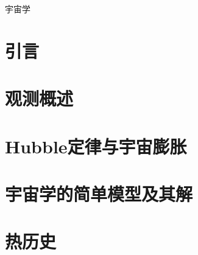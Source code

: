 \documentclass[twocolumn]{article}
\begin{document}
	
	\begin{center}
		{\LARGE \heiti 宇宙学}\\
	\end{center}
	
	\section{引言}
	

	\section{观测概述}
	
	
	\section{Hubble定律与宇宙膨胀}
	
	
	\section{宇宙学的简单模型及其解}
	
	
	\section{热历史}
	
\end{document}
